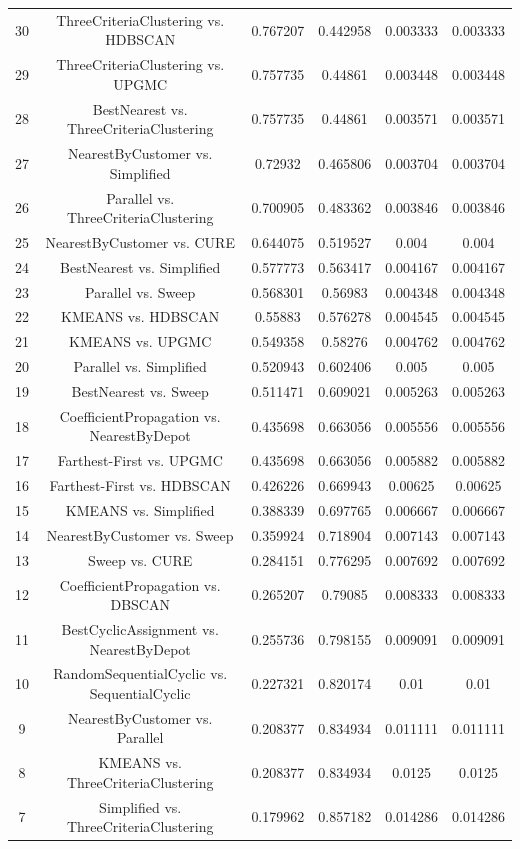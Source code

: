 \documentclass[a4paper,10pt]{article}
\begin{document}
\begin{landscape}
\begin{table}[!htp]
\begin{tabular}{cccccc}
30&ThreeCriteriaClustering vs. HDBSCAN&0.767207&0.442958&0.003333&0.003333\\
29&ThreeCriteriaClustering vs. UPGMC&0.757735&0.44861&0.003448&0.003448\\
28&BestNearest vs. ThreeCriteriaClustering&0.757735&0.44861&0.003571&0.003571\\
27&NearestByCustomer vs. Simplified&0.72932&0.465806&0.003704&0.003704\\
26&Parallel vs. ThreeCriteriaClustering&0.700905&0.483362&0.003846&0.003846\\
25&NearestByCustomer vs. CURE&0.644075&0.519527&0.004&0.004\\
24&BestNearest vs. Simplified&0.577773&0.563417&0.004167&0.004167\\
23&Parallel vs. Sweep&0.568301&0.56983&0.004348&0.004348\\
22&KMEANS vs. HDBSCAN&0.55883&0.576278&0.004545&0.004545\\
21&KMEANS vs. UPGMC&0.549358&0.58276&0.004762&0.004762\\
20&Parallel vs. Simplified&0.520943&0.602406&0.005&0.005\\
19&BestNearest vs. Sweep&0.511471&0.609021&0.005263&0.005263\\
18&CoefficientPropagation vs. NearestByDepot&0.435698&0.663056&0.005556&0.005556\\
17&Farthest-First vs. UPGMC&0.435698&0.663056&0.005882&0.005882\\
16&Farthest-First vs. HDBSCAN&0.426226&0.669943&0.00625&0.00625\\
15&KMEANS vs. Simplified&0.388339&0.697765&0.006667&0.006667\\
14&NearestByCustomer vs. Sweep&0.359924&0.718904&0.007143&0.007143\\
13&Sweep vs. CURE&0.284151&0.776295&0.007692&0.007692\\
12&CoefficientPropagation vs. DBSCAN&0.265207&0.79085&0.008333&0.008333\\
11&BestCyclicAssignment vs. NearestByDepot&0.255736&0.798155&0.009091&0.009091\\
10&RandomSequentialCyclic vs. SequentialCyclic&0.227321&0.820174&0.01&0.01\\
9&NearestByCustomer vs. Parallel&0.208377&0.834934&0.011111&0.011111\\
8&KMEANS vs. ThreeCriteriaClustering&0.208377&0.834934&0.0125&0.0125\\
7&Simplified vs. ThreeCriteriaClustering&0.179962&0.857182&0.014286&0.014286\\

\end{tabular}
\end{table}
\end{landscape}
\end{document}
